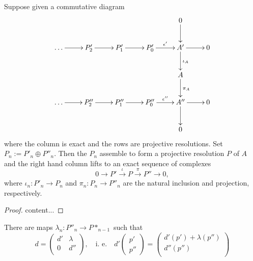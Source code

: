 \begin{lemma}
	Suppose given a commutative diagram
	\begin{align*}
		\xymatrix{
			& & & &0 \ar[d] & \\
			\dots \ar[r] &P'_2 \ar[r] &P'_1 \ar[r] &P'_0 \ar[r]^{\epsilon'} &A' \ar[r] \ar[d]^{\iota_A} &0 \\
			& & & &A \ar[d]^{\pi_A} & \\
			\dots \ar[r] &P''_2 \ar[r] &P''_1 \ar[r] &P''_0 \ar[r]^{\epsilon''} &A'' \ar[r] \ar[d] &0 \\
			& & & &0 & 
		}
	\end{align*}
	where the column is exact and the rows are projective resolutions. Set $P_n:=P'_n\oplus P''_n$. Then the $P_n$ assemble to form a projective resolution $P$ of $A$ and the right hand column lifts to an exact sequence of complexes
	$$0\rightarrow P' \overset{\iota}{\rightarrow} P \overset{\pi}{\rightarrow} P'' \rightarrow 0,$$
	where $\iota_n:P'_n\rightarrow P_n$ and $\pi_n:P_n\rightarrow P''_n$ are the natural inclusion and projection, respectively.
\end{lemma}

\begin{proof}
	content...
\end{proof}

\begin{exercise}
	There are maps $\lambda_n: P''_n\rightarrow P*_{n-1}$ such that
	$$d=\begin{pmatrix}
			d' & \lambda \\
			0 & d'' \\
	\end{pmatrix},
	\quad\text{i. e.}\quad
	d'\begin{pmatrix}p'\\p''\end{pmatrix}=
		\begin{pmatrix}
			d'(p')+\lambda(p'') \\
			d''(p'')\\
		\end{pmatrix}$$
\end{exercise}